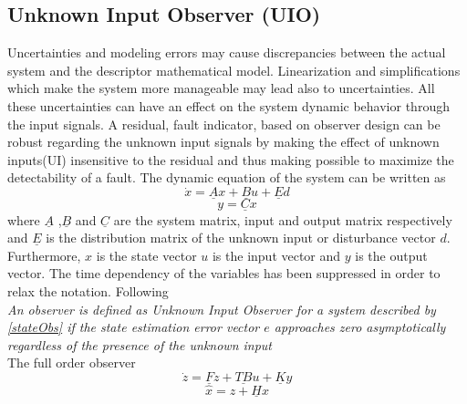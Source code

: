 \subsection{Unknown Input Observer (UIO)}
Uncertainties and modeling errors may cause discrepancies between the actual system and the descriptor mathematical model. Linearization and simplifications which make the system more manageable may lead also to uncertainties. All these uncertainties can have an effect on the system dynamic behavior through the input signals.   
A residual, fault indicator, based on observer design can be robust regarding the unknown input signals by making the effect of unknown inputs(UI) insensitive to the residual and thus making possible to maximize the detectability of a fault. The dynamic equation of the system can be written as
%
\begin{equation}
\dot{x} = \underline Ax+\underline B u+\underline Ed
\label{stateObs}
\end{equation}
\begin{equation}
y = \underline C x
\end{equation}
%
where $\underline A$ ,$\underline B$ and $ \underline C $ are the system matrix, input and output matrix respectively and $\underline E$ is the distribution matrix of the unknown input or disturbance vector $d$. Furthermore, $x$ is the state vector $u$ is the input vector and $y$ is the output vector. The time dependency of the variables has been suppressed in order to relax the notation. Following \cite{UIO} 
%
%
\\
\textit{An observer is defined as Unknown Input Observer for a system described by \eqref{stateObs} if the state estimation error vector $e$ approaches zero asymptotically regardless of the presence of the unknown input }
\\
The full order observer
\begin{equation}
\dot{z} = \underline Fz+\underline{TB} u+\underline Ky
\label{stateObs1}
\end{equation}
\begin{equation}
\hat{x} = z + \underline H x
\end{equation}